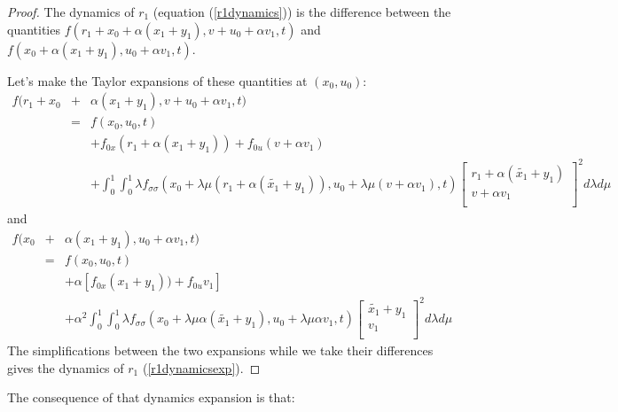 \documentclass[a4paper,10pt]{article}
\begin{document}
\begin{proof}
    The dynamics of $r_{1}$ (equation (\ref{r1dynamics})) is the difference 
    between the quantities    $f(r_{1}+x_{0}+\alpha(x_{1}+y_{1}),v+u_{0}+\alpha v_{1},t)$ and
    $f(x_{0}+\alpha(x_{1}+y_{1}),u_{0}+\alpha v_{1},t)$.
    
    Let's make the Taylor expansions of these quantities at 
    $(x_{0},u_{0})$:
\begin{eqnarray*}
    f(r_{1}+x_{0} & + & \alpha(x_{1}+y_{1}),v+u_{0}+\alpha v_{1},t) \\
    &=&f(x_{0},u_{0},t)\\
     && + f_{0x} (r_{1} + \alpha(x_{1}+y_{1})) + f_{0u}(v+\alpha v_{1})
    \\
     && +  \int_{0}^{1} \int_{0}^{1}
	\lambda f_{\sigma \sigma}(x_{0} + \lambda \mu (r_{1} + \alpha(\tilde{x_{1}}+y_{1})),
	u_{0} + \lambda \mu (v + \alpha v_{1}),t)
	\left[\begin{array}
	{c}
	    r_{1} + \alpha(\tilde{x_{1}}+y_{1})  \\
	     v + \alpha v_{1}\\
	\end{array}\right]^{2} d \lambda d \mu
\end{eqnarray*}
and
\begin{eqnarray*}
    f(x_{0} & + & \alpha(x_{1}+y_{1}), u_{0}  + \alpha v_{1},t) \\
    &=&f(x_{0},u_{0},t)\\
     && +  \alpha [f_{0x}(x_{1}+y_{1})) + f_{0u}v_{1}]
    \\
     && +  \alpha^{2} \int_{0}^{1} \int_{0}^{1}
	\lambda f_{\sigma \sigma}(x_{0} + \lambda \mu\alpha(\tilde{x_{1}}+y_{1}),
	u_{0} + \lambda \mu \alpha v_{1},t)
	\left[\begin{array}
	{c}
	    \tilde{x_{1}}+y_{1}  \\
	      v_{1} \\
	\end{array}\right]^{2} d \lambda d \mu 
\end{eqnarray*}
The simplifications between the two expansions while we take their 
differences gives the dynamics of $r_{1}$ (\ref{r1dynamicsexp}).
\end{proof}
The consequence of that dynamics expansion is that:
\end{document}
